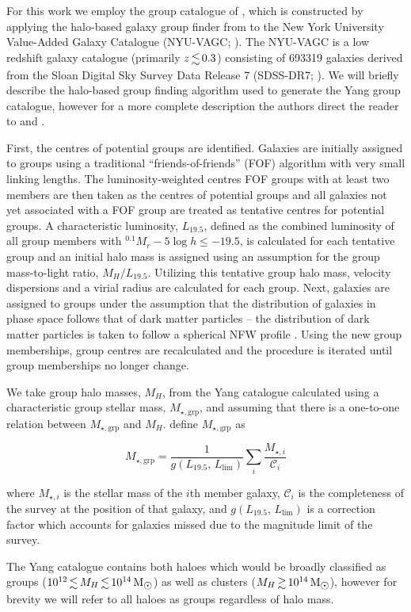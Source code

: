 \documentclass[a4paper,fleqn,usenatbib]{mnras}
\newcommand{\Msun}{\,\mathrm{M_{\sun}}}
\begin{document}
For this work we employ the group catalogue of \citet{yang2007}, which
is constructed by applying the halo-based galaxy group finder from
\citet{yang2005, yang2007} to the New York University Value-Added
Galaxy Catalogue (NYU-VAGC; \citealt{blanton2005}).  The NYU-VAGC is a
low redshift galaxy catalogue (primarily $z \la 0.3$) consisting of
693319 galaxies derived from the Sloan Digital Sky Survey Data Release
7 (SDSS-DR7; \citealt{abazajian2009}).  We will briefly describe the
halo-based group finding algorithm used to generate the Yang group catalogue,
however for a more complete description the authors direct the reader
to \citet{yang2005} and \citet{yang2007}.
\par
First, the centres of potential groups are identified.  Galaxies are
initially assigned to groups using a traditional
``friends-of-friends'' (FOF) algorithm \citep[][e.g.]{huchra1982} with
very small linking lengths.  The luminosity-weighted centres 
FOF groups with at least two members are then taken as the centres of
potential groups and all galaxies not yet associated with a FOF group
are treated as tentative centres for potential groups.  A
characteristic luminosity, $L_{19.5}$, defined as the combined
luminosity of all group members with $^{0.1}M_r - 5\log h \le -19.5$,
is calculated for each tentative group and an initial halo mass is
assigned using an assumption for the group mass-to-light ratio,
$M_H/L_{19.5}$.  Utilizing this tentative group halo mass, velocity
dispersions and a virial radius are calculated for each group.  Next,
galaxies are assigned to groups under the assumption that the
distribution of galaxies in phase space follows that of dark matter
particles -- the distribution of dark matter particles is taken to
follow a spherical NFW profile \citep{navarro1997}.  Using the new
group memberships, group centres are recalculated and the procedure is
iterated until group memberships no longer change.
\par
We take group halo masses, $M_H$, from the Yang catalogue calculated
using a characteristic group stellar mass, $M_{\star,\text{grp}}$, and
assuming that there is a one-to-one relation between $M_{\star,\text{grp}}$
and $M_H$.  \citet{yang2007} define $M_{\star,\text{grp}}$ as

\begin{equation}
  M_{\star,\text{grp}} = \frac{1}{g(L_{19.5},\,L_{\text{lim}})} \sum_i
  \frac{M_{\star,i}}{\mathcal{C}_i}
\end{equation}

\noindent
where $M_{\star,i}$ is the stellar mass of the $i$th member galaxy,
$\mathcal{C}_i$ is the completeness of the survey at the position of
that galaxy, and $g(L_{19.5},\,L_{\text{lim}})$ is a correction factor
which accounts for galaxies missed due to the magnitude limit of the
survey.
\par
The Yang catalogue contains both haloes which would be broadly classified as
groups ($10^{12} \la M_H \la 10^{14}\Msun$) as well as clusters ($M_H
\ga 10^{14}\Msun$), however for brevity we will refer to all haloes as
groups regardless of halo mass.
\end{document}
